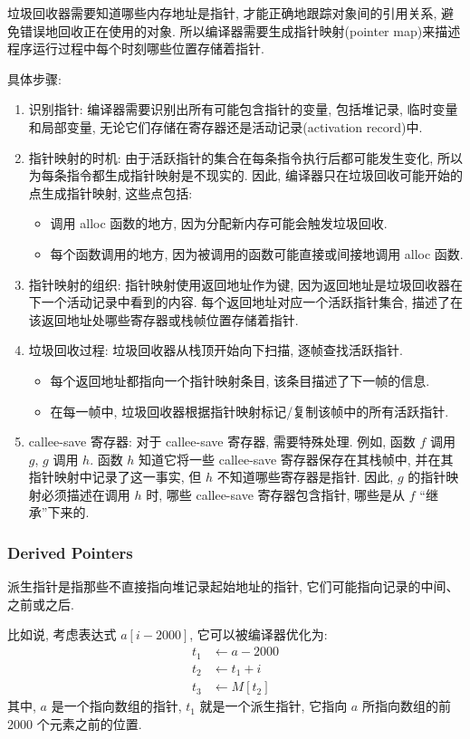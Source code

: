 垃圾回收器需要知道哪些内存地址是指针, 才能正确地跟踪对象间的引用关系, 避免错误地回收正在使用的对象. 所以编译器需要生成指针映射(pointer map)来描述程序运行过程中每个时刻哪些位置存储着指针. 

具体步骤:
\begin{enumerate}
    \item 识别指针: 编译器需要识别出所有可能包含指针的变量, 包括堆记录, 临时变量和局部变量, 无论它们存储在寄存器还是活动记录(activation record)中. 
    \item 指针映射的时机: 由于活跃指针的集合在每条指令执行后都可能发生变化, 所以为每条指令都生成指针映射是不现实的. 因此, 编译器只在垃圾回收可能开始的点生成指针映射, 这些点包括:
    \begin{itemize}
        \item 调用 alloc 函数的地方, 因为分配新内存可能会触发垃圾回收. 
        \item 每个函数调用的地方, 因为被调用的函数可能直接或间接地调用 alloc 函数. 
    \end{itemize}
    \item 指针映射的组织: 指针映射使用返回地址作为键, 因为返回地址是垃圾回收器在下一个活动记录中看到的内容. 每个返回地址对应一个活跃指针集合, 描述了在该返回地址处哪些寄存器或栈帧位置存储着指针. 
    \item 垃圾回收过程: 垃圾回收器从栈顶开始向下扫描, 逐帧查找活跃指针. 
    \begin{itemize}
        \item 每个返回地址都指向一个指针映射条目, 该条目描述了下一帧的信息. 
        \item 在每一帧中, 垃圾回收器根据指针映射标记/复制该帧中的所有活跃指针. 
    \end{itemize}
    \item callee-save 寄存器: 对于 callee-save 寄存器, 需要特殊处理. 
    \subitem 例如, 函数 $f$ 调用 $g$, $g$ 调用 $h$. 函数 $h$ 知道它将一些 callee-save 寄存器保存在其栈帧中, 并在其指针映射中记录了这一事实, 但 $h$ 不知道哪些寄存器是指针. 因此, $g$ 的指针映射必须描述在调用 $h$ 时, 哪些 callee-save 寄存器包含指针, 哪些是从 $f$ “继承”下来的.
\end{enumerate}


\subsubsection{Derived Pointers}
派生指针是指那些不直接指向堆记录起始地址的指针, 它们可能指向记录的中间、之前或之后. 


比如说, 考虑表达式 $a[i-2000]$, 它可以被编译器优化为: 
\begin{align*}
    t_1 &\leftarrow a - 2000\\
    t_2 &\leftarrow t_1 + i \\
    t_3 &\leftarrow M[t_2]
\end{align*}
其中, $a$ 是一个指向数组的指针, $t_1$ 就是一个派生指针, 它指向 $a$ 所指向数组的前 2000 个元素之前的位置. 

